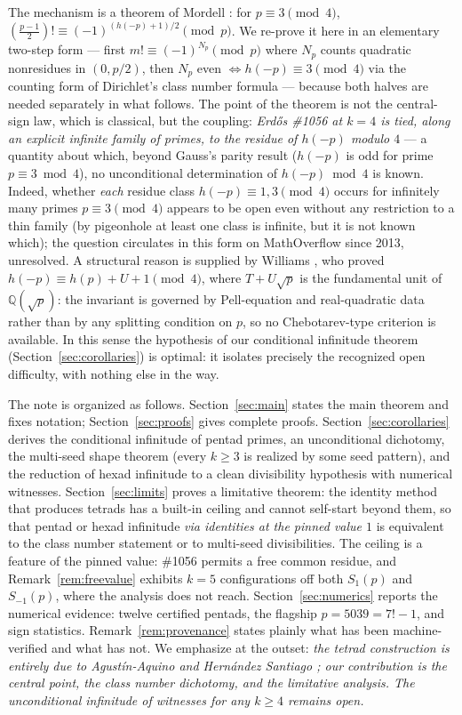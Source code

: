 \documentclass[11pt]{article}
\theoremstyle{definition}
\theoremstyle{remark}
\begin{document}
The mechanism is a theorem of Mordell \cite{Mordell}: for $p \equiv 3 \pmod
4$, $\left(\frac{p-1}{2}\right)! \equiv (-1)^{(h(-p)+1)/2} \pmod p$. We
re-prove it here in an elementary two-step form --- first
$m! \equiv (-1)^{N_p} \pmod p$ where $N_p$ counts quadratic nonresidues in
$(0, p/2)$, then $N_p$ even $\iff h(-p) \equiv 3 \pmod 4$ via the counting
form of Dirichlet's class number formula --- because both halves are needed
separately in what follows. The point of the theorem is not the central-sign
law, which is classical, but the coupling: \emph{Erd\H{o}s \#1056 at $k = 4$
is tied, along an explicit infinite family of primes, to the residue of
$h(-p)$ modulo $4$} --- a quantity about which, beyond Gauss's parity result
($h(-p)$ is odd for prime $p \equiv 3 \bmod 4$), no unconditional
determination of $h(-p) \bmod 4$ is known.
Indeed, whether \emph{each} residue class $h(-p) \equiv 1, 3 \pmod 4$
occurs for infinitely many primes $p \equiv 3 \pmod 4$ appears to be open
even without any restriction to a thin family (by pigeonhole at least one
class is infinite, but it is not known which); the question circulates in
this form on MathOverflow since 2013, unresolved. A structural reason is
supplied by Williams \cite{Wi79}, who proved
$h(-p) \equiv h(p) + U + 1 \pmod 4$, where $T + U\sqrt{p}$ is the
fundamental unit of $\mathbb{Q}(\sqrt{p})$: the invariant is governed by
Pell-equation and real-quadratic data rather than by any splitting
condition on $p$, so no Chebotarev-type criterion is available. In this
sense the hypothesis of our conditional infinitude theorem
(Section~\ref{sec:corollaries}) is optimal: it isolates precisely the
recognized open difficulty, with nothing else in the way.

The note is organized as follows. Section~\ref{sec:main} states the main
theorem and fixes notation; Section~\ref{sec:proofs} gives complete proofs.
Section~\ref{sec:corollaries} derives the conditional infinitude of pentad
primes, an unconditional dichotomy, the multi-seed shape theorem (every
$k \ge 3$ is realized by some seed pattern), and the reduction of hexad
infinitude to a clean divisibility hypothesis with numerical witnesses.
Section~\ref{sec:limits} proves a limitative theorem: the identity method
that produces tetrads has a built-in ceiling and cannot self-start beyond
them, so that pentad or hexad infinitude \emph{via identities at the pinned
value $1$} is equivalent to the class number statement or to multi-seed
divisibilities. The ceiling is a feature of the pinned value: \#1056 permits
a free common residue, and Remark~\ref{rem:freevalue} exhibits $k = 5$
configurations off both $S_1(p)$ and $S_{-1}(p)$, where the analysis does
not reach.
Section~\ref{sec:numerics} reports the numerical evidence: twelve certified
pentads, the flagship $p = 5039 = 7!-1$, and sign statistics.
Remark~\ref{rem:provenance} states plainly what has been machine-verified and
what has not. We emphasize at the outset: \emph{the tetrad construction is
entirely due to Agust\'in-Aquino and Hern\'andez Santiago \cite{AAHS}; our
contribution is the central point, the class number dichotomy, and the
limitative analysis. The unconditional infinitude of witnesses for any
$k \ge 4$ remains open.}
\end{document}
